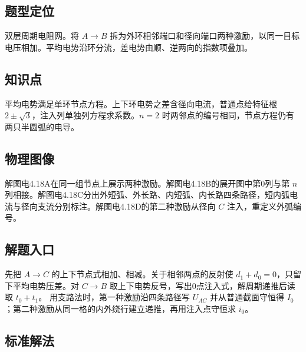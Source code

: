 \documentclass[UTF8,fontset=fandol,a4paper,11pt]{ctexart}
\begin{document}


\subsection*{题型定位}

双层周期电阻网。将 $A\to B$ 拆为外环相邻端口和径向端口两种激励，以同一目标电压相加。平均电势沿环分流，差电势由顺、逆两向的指数项叠加。



\subsection*{知识点}

平均电势满足单环节点方程。上下环电势之差含径向电流，普通点给特征根 $2\pm\sqrt3$，注入列单独列方程求系数。$n=2$ 时两邻点的编号相同，节点方程仍有两只半圆弧的电导。



\subsection*{物理图像}

解图电4.18A在同一组节点上展示两种激励。解图电4.18B的展开图中第0列与第 $n$ 列相接。解图电4.18C分出外短弧、外长路、内短弧、内长路四条路径，短内弧电流与径向支流分别标注。解图电4.18D的第二种激励从径向 $C$ 注入，重定义外弧编号。



\subsection*{解题入口}

先把 $A\to C$ 的上下节点式相加、相减。关于相邻两点的反射使 $d_1+d_0=0$，只留下平均电势压差。对 $C\to B$ 取上下电势反号，写出0点注入式，解周期递推后读取 $t_0+t_1$。
用支路法时，第一种激励沿四条路径写 $U_{AC}$ 并从普通截面守恒得 $I_0$；第二种激励从同一格的内外绕行建立递推，再用注入点守恒求 $i_0$。


\subsection*{标准解法}
\end{document}
